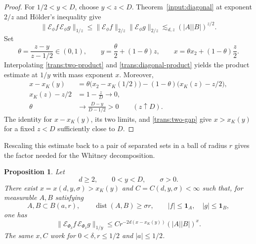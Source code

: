 \documentclass[11pt]{article}
\numberwithin{equation}{section}
\newtheorem{proposition}[theorem]{Proposition}
\newcommand{\norm}[1]{\lVert #1\rVert}
\newcommand{\dist}{\operatorname{dist}}
\begin{document}
\begin{proof}
For \(1/2<y<D\), choose \(y<z<D\). Theorem~\ref{input:diagonal}
at exponent \(2/z\) and H\"older's inequality give
\begin{equation}\label{trans:diagonal-product}
 \norm{\mathcal E_\phi f\,\mathcal E_\phi g}_{1/z}
 \leq \norm{\mathcal E_\phi f}_{2/z}\norm{\mathcal E_\phi g}_{2/z}
 \lesssim_{d,z}(|A||B|)^{z/2}.
\end{equation}
Set
\[
 \theta=\frac{z-y}{z-1/2}\in(0,1),\qquad
 y=\frac{\theta}{2}+(1-\theta)z,\qquad
 x=\theta x_2+(1-\theta)\frac z2.
\]
Interpolating \eqref{trans:two-product} and
\eqref{trans:diagonal-product} yields the product estimate at \(1/y\) with
mass exponent \(x\). Moreover,
\begin{align*}
 x-x_K(y)
 &=\theta\bigl(x_2-x_K(1/2)\bigr)
      -(1-\theta)\bigl(x_K(z)-z/2\bigr),\\
 x_K(z)-z/2&=1-\frac{z}{D}\longrightarrow0,\\
 \theta&\longrightarrow\frac{D-y}{D-1/2}>0
 \qquad (z\uparrow D).
\end{align*}
The identity for \(x-x_K(y)\), its two limits, and
\eqref{trans:two-gap} give \(x>x_K(y)\) for a fixed \(z<D\)
sufficiently close to \(D\).
\end{proof}

Rescaling this estimate back to a pair of separated sets in a ball
of radius \(r\) gives the factor needed for the Whitney decomposition.

\begin{proposition}\label{trans:rescaled}
Let
\[
 d\geq2,\qquad 0<y<D,\qquad \sigma>0.
\]
There exist \(x=x(d,y,\sigma)>x_K(y)\) and
\(C=C(d,y,\sigma)<\infty\) such that, for measurable \(A,B\) satisfying
\[
 A,B\subset B(a,r),\qquad \dist(A,B)\geq\sigma r,\qquad
 |f|\leq\mathbf1_A,\quad |g|\leq\mathbf1_B,
\]
one has
\[
 \norm{\mathcal E_{\Phi_\delta}f\,\mathcal E_{\Phi_\delta}g}_{1/y}
 \leq C r^{-2d(x-x_K(y))}(|A||B|)^x.
\]
The same \(x,C\) work for
\(0<\delta,r\leq1/2\) and \(|a|\leq1/2\).
\end{proposition}
\end{document}
